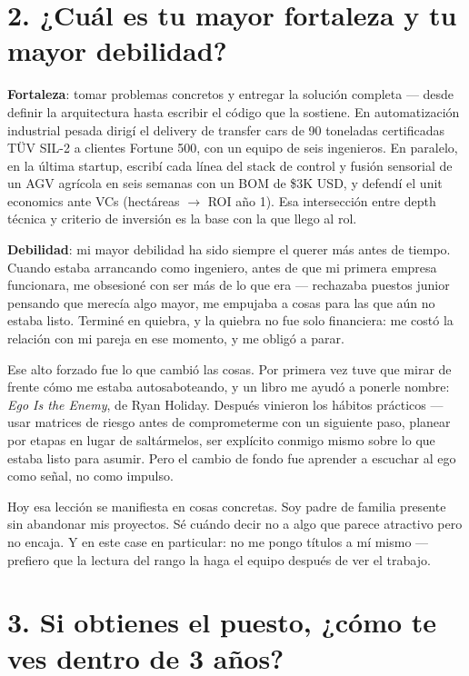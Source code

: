 \documentclass[11pt, letterpaper]{article}
\begin{document}
\section*{2. ¿Cuál es tu mayor fortaleza y tu mayor debilidad?}

\textbf{Fortaleza}: tomar problemas concretos y entregar la solución completa --- desde definir la arquitectura hasta escribir el código que la sostiene. En automatización industrial pesada dirigí el delivery de transfer cars de 90 toneladas certificadas TÜV SIL-2 a clientes Fortune 500, con un equipo de seis ingenieros. En paralelo, en la última startup, escribí cada línea del stack de control y fusión sensorial de un AGV agrícola en seis semanas con un BOM de \$3K USD, y defendí el unit economics ante VCs (hectáreas $\to$ ROI año 1). Esa intersección entre depth técnica y criterio de inversión es la base con la que llego al rol.

\textbf{Debilidad}: mi mayor debilidad ha sido siempre el querer más antes de tiempo. Cuando estaba arrancando como ingeniero, antes de que mi primera empresa funcionara, me obsesioné con ser más de lo que era --- rechazaba puestos junior pensando que merecía algo mayor, me empujaba a cosas para las que aún no estaba listo. Terminé en quiebra, y la quiebra no fue solo financiera: me costó la relación con mi pareja en ese momento, y me obligó a parar.

Ese alto forzado fue lo que cambió las cosas. Por primera vez tuve que mirar de frente cómo me estaba autosaboteando, y un libro me ayudó a ponerle nombre: \textit{Ego Is the Enemy}, de Ryan Holiday. Después vinieron los hábitos prácticos --- usar matrices de riesgo antes de comprometerme con un siguiente paso, planear por etapas en lugar de saltármelos, ser explícito conmigo mismo sobre lo que estaba listo para asumir. Pero el cambio de fondo fue aprender a escuchar al ego como señal, no como impulso.

Hoy esa lección se manifiesta en cosas concretas. Soy padre de familia presente sin abandonar mis proyectos. Sé cuándo decir no a algo que parece atractivo pero no encaja. Y en este case en particular: no me pongo títulos a mí mismo --- prefiero que la lectura del rango la haga el equipo después de ver el trabajo.

\section*{3. Si obtienes el puesto, ¿cómo te ves dentro de 3 años?}
\end{document}
